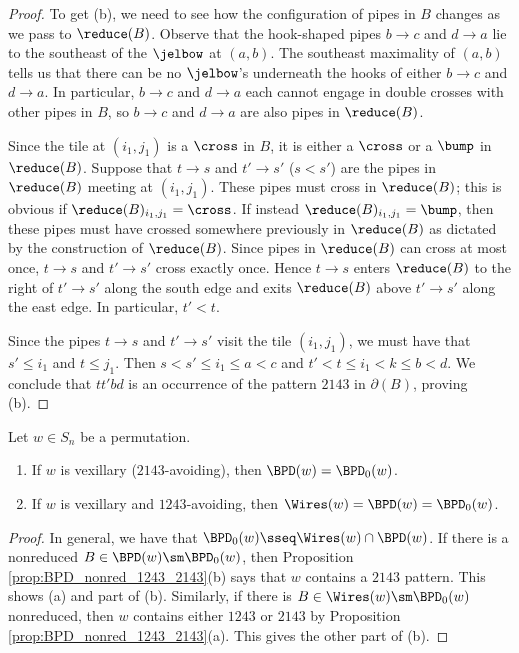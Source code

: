 \begin{proof}
    To get (b), we need to see how the configuration of pipes in $B$ changes as we pass to $\reduce(B)$.
    Observe that the hook-shaped pipes $b\to c$ and $d\to a$ lie to the southeast of the $\jelbow$ at $(a,b)$.
    The southeast maximality of $(a,b)$ tells us that there can be no $\jelbow$'s underneath the hooks of either $b\to c$ and $d\to a$.
    In particular, $b\to c$ and $d\to a$ each cannot engage in double crosses with other pipes in $B$, so $b\to c$ and $d\to a$ are also pipes in $\reduce(B)$.
    
    Since the tile at $(i_1,j_1)$ is a $\cross$ in $B$, it is either a $\cross$ or a $\bump$ in $\reduce(B)$.
    Suppose that $t\to s$ and $t'\to s'$ ($s< s'$) are the pipes in $\reduce(B)$ meeting at $(i_1,j_1)$.
    These pipes must cross in $\reduce(B)$; this is obvious if $\reduce(B)_{i_1,j_1} = \cross$.
    If instead $\reduce(B)_{i_1,j_1}=\bump$, then these pipes must have crossed somewhere previously in $\reduce(B)$ as dictated by the construction of $\reduce(B)$.
    Since pipes in $\reduce(B)$ can cross at most once, $t\to s$ and $t'\to s'$ cross exactly once.
    Hence $t\to s$ enters $\reduce(B)$ to the right of $t'\to s'$ along the south edge and exits $\reduce(B)$ above $t'\to s'$ along the east edge. In particular, $t'< t$.
    
Since the pipes $t\to s$ and $t'\to s'$ visit the tile $(i_1,j_1)$, we must have that $s'\leq i_1$ and $t\leq j_1$.
Then $s< s'\leq i_1\leq a< c$ and $t'<t\leq i_1< k\leq b< d$.
We conclude that $tt'bd$ is an occurrence of the pattern $2143$ in $\partial(B)$, proving (b).
\end{proof}

\begin{corollary}
\label{cor:BPD_1243_2143}
    Let $w\in S_n$ be a permutation.
    \begin{enumerate}
        \item[(a)] If $w$ is vexillary \textup{(}$2143$-avoiding\textup{)}, then $\BPD(w) = \BPD_0(w)$.
        \item[(b)] If $w$ is vexillary and $1243$-avoiding, then 
        $\Wires(w) = \BPD(w) = \BPD_0(w)$.
    \end{enumerate}
\end{corollary}

\begin{proof}
    In general, we have that $\BPD_0(w) \sseq \Wires(w)\cap \BPD(w)$.
    If there is a nonreduced $B\in \BPD(w)\sm \BPD_0(w)$, then Proposition \ref{prop:BPD_nonred_1243_2143}(b) says that $w$ contains a $2143$ pattern.
    This shows (a) and part of (b).
    Similarly, if there is $B\in \Wires(w)\sm \BPD_0(w)$ nonreduced, then $w$ contains either $1243$ or $2143$ by Proposition \ref{prop:BPD_nonred_1243_2143}(a).
    This gives the other part of (b).
\end{proof}

